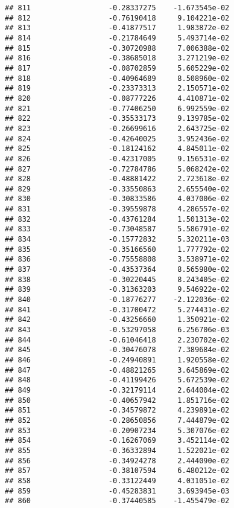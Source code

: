 \documentclass[
]{article}
\begin{document}
\begin{verbatim}
## 811                  -0.28337275    -1.673545e-02
## 812                  -0.76190418     9.104221e-02
## 813                  -0.41877517     1.983872e-02
## 814                  -0.21784649     5.493714e-02
## 815                  -0.30720988     7.006388e-02
## 816                  -0.38685018     3.271219e-02
## 817                  -0.08702859     5.605229e-02
## 818                  -0.40964689     8.508960e-02
## 819                  -0.23373313     2.150571e-02
## 820                  -0.08777226     4.410871e-02
## 821                  -0.77406250     6.992559e-02
## 822                  -0.35533173     9.139785e-02
## 823                  -0.26699616     2.643725e-02
## 824                  -0.42640025     3.952436e-02
## 825                  -0.18124162     4.845011e-02
## 826                  -0.42317005     9.156531e-02
## 827                  -0.72784786     5.068242e-02
## 828                  -0.48881422     2.723618e-02
## 829                  -0.33550863     2.655540e-02
## 830                  -0.30833586     4.037006e-02
## 831                  -0.39559878     4.286557e-02
## 832                  -0.43761284     1.501313e-02
## 833                  -0.73048587     5.586791e-02
## 834                  -0.15772832     5.320211e-03
## 835                  -0.35166560     1.777792e-02
## 836                  -0.75558808     3.538971e-02
## 837                  -0.43537364     8.565980e-02
## 838                  -0.30220445     8.243405e-02
## 839                  -0.31363203     9.546922e-02
## 840                  -0.18776277    -2.122036e-02
## 841                  -0.31700472     5.274431e-02
## 842                  -0.43256660     1.350921e-02
## 843                  -0.53297058     6.256706e-03
## 844                  -0.61046418     2.230702e-02
## 845                  -0.30476078     7.389684e-02
## 846                  -0.24940891     1.920558e-02
## 847                  -0.48821265     3.645869e-02
## 848                  -0.41199426     5.672539e-02
## 849                  -0.32179114     2.644004e-02
## 850                  -0.40657942     1.851716e-02
## 851                  -0.34579872     4.239891e-02
## 852                  -0.28650856     7.444879e-02
## 853                  -0.20907234     5.307076e-02
## 854                  -0.16267069     3.452114e-02
## 855                  -0.36332894     1.522021e-02
## 856                  -0.34924278     2.444090e-02
## 857                  -0.38107594     6.480212e-02
## 858                  -0.33122449     4.031051e-02
## 859                  -0.45283831     3.693945e-03
## 860                  -0.37440585    -1.455479e-02

\end{verbatim}
\end{document}
